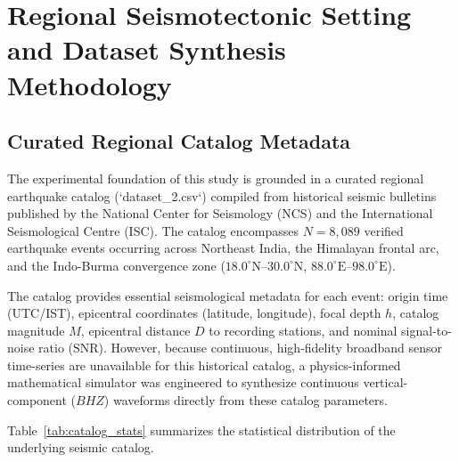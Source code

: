\documentclass[journal]{IEEEtran}
\begin{document}
\section{Regional Seismotectonic Setting and Dataset Synthesis Methodology}

\subsection{Curated Regional Catalog Metadata}
The experimental foundation of this study is grounded in a curated regional earthquake catalog (`dataset\_2.csv`) compiled from historical seismic bulletins published by the National Center for Seismology (NCS) and the International Seismological Centre (ISC). The catalog encompasses $N = 8,089$ verified earthquake events occurring across Northeast India, the Himalayan frontal arc, and the Indo-Burma convergence zone ($18.0^\circ\text{N}$--$30.0^\circ\text{N}$, $88.0^\circ\text{E}$--$98.0^\circ\text{E}$).

The catalog provides essential seismological metadata for each event: origin time (UTC/IST), epicentral coordinates (latitude, longitude), focal depth $h$, catalog magnitude $M$, epicentral distance $D$ to recording stations, and nominal signal-to-noise ratio ($\text{SNR}$). However, because continuous, high-fidelity broadband sensor time-series are unavailable for this historical catalog, a physics-informed mathematical simulator was engineered to synthesize continuous vertical-component ($BHZ$) waveforms directly from these catalog parameters.

Table~\ref{tab:catalog_stats} summarizes the statistical distribution of the underlying seismic catalog.

\begin{table}[t]
\caption{Seismotectonic Envelope and Catalog Metadata Statistics ($N = 8,089$)}
\label{tab:catalog_stats}
\centering
{}
\end{table}
\end{document}
